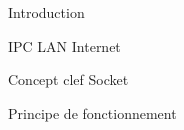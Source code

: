 \begin{frame}{Introduction}
  
  IPC
  LAN
  Internet
\end{frame}

\begin{frame}{Concept clef}
  Socket
  
\end{frame}

\begin{frame}{Principe de fonctionnement}
  
\end{frame}